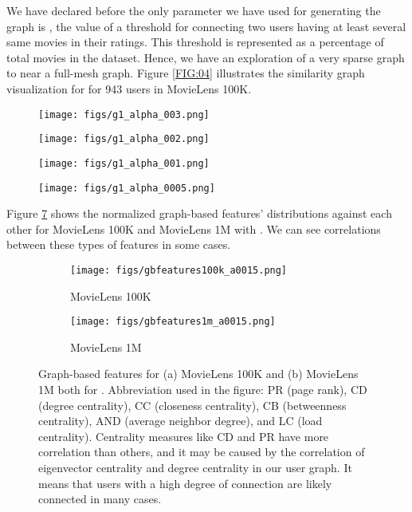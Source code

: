 \documentclass[a4paper,fleqn]{cas-dc}
\begin{document}
We have declared before the only parameter we have used for generating the graph is , the value of a threshold for connecting two users having at least several same movies in their ratings. This threshold is represented as a percentage of total movies in the dataset. Hence, we have an exploration of a very sparse graph to near a full-mesh graph. Figure \ref{FIG:04} illustrates the similarity graph visualization for  for 943 users in MovieLens 100K.

\begin{figure*}

	\centering
	\begin{subfigure}{0.23\textwidth}
		\centering
		\texttt{[image: figs/g1\_alpha\_003.png]}
		\caption{}
		\label{FIG:04:a}
	\end{subfigure}
	\begin{subfigure}{0.23\textwidth}
		\centering
		\texttt{[image: figs/g1\_alpha\_002.png]}
		\caption{}
		\label{FIG:04:b}
	\end{subfigure}
	\begin{subfigure}{0.23\textwidth}
		\centering
		\texttt{[image: figs/g1\_alpha\_001.png]}
		\caption{}
		\label{FIG:04:c}
	\end{subfigure}
	\begin{subfigure}{0.23\textwidth}
		\centering
		\texttt{[image: figs/g1\_alpha\_0005.png]}
		\caption{}
		\label{FIG:04:d}
	\end{subfigure}

	\caption{Visualization of Similarity Graph for  for MovieLens 100K with 943 users.}
	\label{FIG:04}
\end{figure*}


Figure \ref{FIG:05} shows the normalized graph-based features' distributions against each other for MovieLens 100K and MovieLens 1M with . We can see correlations between these types of features in some cases.

\begin{figure}

	\begin{subfigure}{.45\textwidth}
		\centering
		\texttt{[image: figs/gbfeatures100k\_a0015.png]}
		\caption{MovieLens 100K}
		\label{FIG:05:a}
	\end{subfigure}
	\begin{subfigure}{.45\textwidth}
		\centering
		\texttt{[image: figs/gbfeatures1m\_a0015.png]}
		\caption{MovieLens 1M}
		\label{FIG:05:b}
	\end{subfigure}

	\caption{Graph-based features for (a) MovieLens 100K and (b) MovieLens 1M both for . Abbreviation used in the figure: PR (page rank), CD (degree centrality), CC (closeness centrality), CB (betweenness centrality), AND (average neighbor degree), and LC (load centrality). Centrality measures like CD and PR have more correlation than others, and it may be caused by the correlation of eigenvector centrality and degree centrality in our user graph. It means that users with a high degree of connection are likely connected in many cases.}
	\label{FIG:05}
\end{figure}
\end{document}
